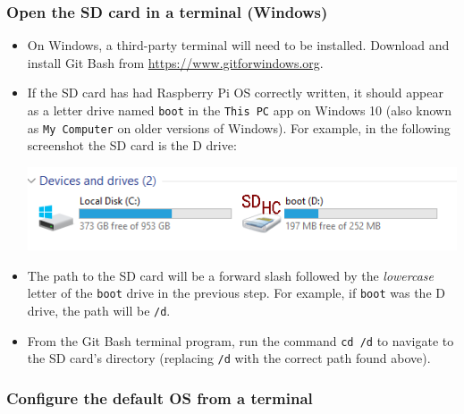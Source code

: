 \documentclass{article}
\begin{document}
\subsubsection{Open the SD card in a terminal (Windows)}
\begin{itemize}
    \item On Windows, a third-party terminal will need to be installed. Download and install Git Bash from \url{https://www.gitforwindows.org}. 
    
    \item If the SD card has had Raspberry Pi OS correctly written, it should appear as a letter drive named \texttt{boot} in the \texttt{This PC} app on Windows 10 (also known as \texttt{My Computer} on older versions of Windows). For example, in the following screenshot the SD card is the D drive:
    
    \includegraphics[width=\textwidth]{images/windows-boot-drive.png}
    
    \item The path to the SD card will be a forward slash followed by the \emph{lowercase} letter of the \texttt{boot} drive in the previous step. For example, if \texttt{boot} was the D drive, the path will be \texttt{/d}. 
    
    \item From the Git Bash terminal program, run the command \texttt{cd /d} to navigate to the SD card's directory (replacing \texttt{/d} with the correct path found above).
\end{itemize}

\subsubsection{Configure the default OS from a terminal}
\end{document}
